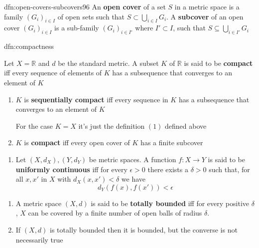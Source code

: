 \documentclass[landscape, 8pt]{extarticle}
\begin{document}
\begin{multicols}{3}
\begin{dfn}{dfn:open-covers-subcovers}{96}
    \vspace{-5pt}
    An \textbf{open cover} of a set $S$ in a metric space is a family $(G_{i})_{i\in I}$ of open sets such that $S \subset \bigcup\limits_{i \in I} G_{i}$. A \textbf{subcover} of an open cover $(G_{i})_{i\in I}$ is a sub-family $(G_{i})_{i\in I'}$ where $I' \subset I$, such that $S \subseteq \bigcup_{i\in I'} G_{i}$
\end{dfn}

\begin{dfn}{dfn:compactness}{}
    \vspace{-5pt}

    \vspace{-2pt}
    Let $X = \mathbb{R}$ and $d$ be the standard metric. A subset $K$ of $\mathbb{R}$ is said to be \textbf{compact} iff every sequence of elements of $K$ has a subsequence that converges to an element of $K$

    \vspace{-8pt}
    \begin{enumerate}[leftmargin=*]
        \item $K$ is \textbf{sequentially compact} iff every sequence in $K$ has a subsequence that converges to an element of $K$

            For the case $K = X$ it's just the definition $(1)$ defined above
        \item $K$ is \textbf{compact} iff every open cover of $K$ has a finite subcover
    \end{enumerate}

    \vspace{-5pt}
    \vspace{-8pt}
    \begin{enumerate}[leftmargin=*]
        \item[3.] Let $(X, d_{X}), (Y, d_{Y})$ be metric spaces. A function $f : X \to Y$ is said to be \textbf{uniformly continuous} iff for every $\epsilon>0$ there exists a $\delta>0$ such that, for all $x, x'$ in $X$ with $d_{X}(x, x') < \delta$ we have
            \[d_{Y}(f(x), f(x')) < \epsilon\]
    \end{enumerate}

    \vspace{-3pt}
    \vspace{-8pt}
    \begin{enumerate}[leftmargin=*]
        \item[\textbf{117}:] A metric space $(X, d)$ is said to be \textbf{totally bounded} iff for every positive $\delta$, $X$ can be covered by a finite number of open balls of radius $\delta$.
        \item[\textbf{118}:] If $(X, d)$ is totally bounded then it is bounded, but the converse is not necessarily true
    \end{enumerate}
    

\end{dfn}
\end{multicols}
\end{document}
